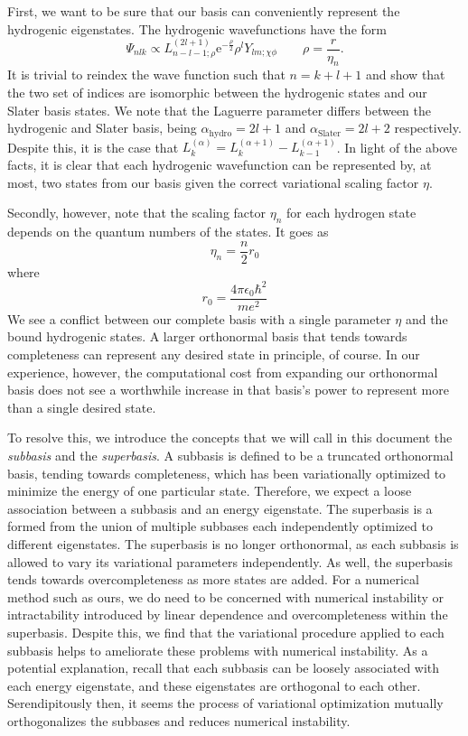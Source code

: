 First, we want to be sure that our basis can conveniently represent the
hydrogenic eigenstates. The hydrogenic wavefunctions have the form
\begin{equation}
  \Psi_{nlk}
  \propto
  L_{n-l-1;\rho}^{\left(2l+1\right)}
  \mathrm{e}^{-\frac{\rho}{2}}
  \rho^{l}
  Y_{lm;\chi\phi}
  \quad\quad
  \rho 
  =
  \frac{r}{\eta_{n}}.
\end{equation}
It is trivial to reindex the wave function such that $n = k + l + 1$ and show
that the two set of indices are isomorphic between the hydrogenic states and our
Slater basis states. We note that the Laguerre parameter differs between the
hydrogenic and Slater basis, being $\alpha_{\text{hydro}} = 2l+1$ and
$\alpha_{\text{Slater}} = 2l+2$ respectively. Despite this, it is the case
that $L_{k}^{\left(\alpha\right)} = L_{k}^{\left(\alpha+1\right)} -
L_{k-1}^{\left(\alpha+1\right)}$. In light of the above facts, it is clear that
each hydrogenic wavefunction can be represented by, at most, two states from our
basis given the correct variational scaling factor $\eta$.

Secondly, however, note that the scaling factor $\eta_{n}$ for each hydrogen
state depends on the quantum numbers of the states. It goes as
\begin{equation}
  \eta_{n} = \frac{n}{2}r_{0}
\end{equation}
where 
\begin{equation}
  r_{0} = \frac{4\pi\epsilon_{0}\hbar^{2}}{me^{2}}
\end{equation}
We see a conflict between our complete basis with a single parameter $\eta$ and
the bound hydrogenic states.  A larger orthonormal basis that tends towards
completeness can represent any desired state in principle, of course. In our
experience, however, the computational cost from expanding our orthonormal basis
does not see a worthwhile increase in that basis's power to represent more than
a single desired state.

To resolve this, we introduce the concepts that we will call in this document
the \emph{subbasis} and the \emph{superbasis}. A subbasis is defined to be a
truncated orthonormal basis, tending towards completeness, which has been
variationally optimized to minimize the energy of one particular state.
Therefore, we expect a loose association between a subbasis and an energy
eigenstate. The superbasis is a formed from the union of multiple subbases each
independently optimized to different eigenstates. The superbasis is no longer
orthonormal, as each subbasis is allowed to vary its variational parameters
independently. As well, the superbasis tends towards overcompleteness as more
states are added. For a numerical method such as ours, we do need to be
concerned with numerical instability or intractability introduced by linear
dependence and overcompleteness within the superbasis. Despite this, we find
that the variational procedure applied to each subbasis helps to ameliorate
these problems with numerical instability. As a potential explanation, recall
that each subbasis can be loosely associated with each energy eigenstate, and
these eigenstates are orthogonal to each other. Serendipitously then, it seems
the process of variational optimization mutually orthogonalizes the subbases and
reduces numerical instability.